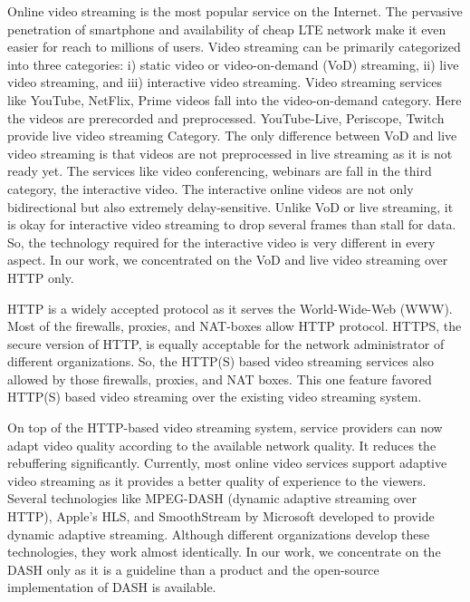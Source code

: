 Online video streaming is the most popular service on the Internet. The pervasive penetration of smartphone and availability of cheap LTE network make it even easier for reach to millions of users.
Video streaming can be primarily categorized into three categories: i) static video or video-on-demand (VoD) streaming, ii) live video streaming, and iii) interactive video streaming. Video streaming services like YouTube, NetFlix, Prime videos fall into the video-on-demand category. Here the videos are prerecorded and preprocessed. YouTube-Live, Periscope, Twitch provide live video streaming Category. The only difference between VoD and live video streaming is that videos are not preprocessed in live streaming as it is not ready yet. The services like video conferencing, webinars are fall in the third category, the interactive video. The interactive online videos are not only bidirectional but also extremely delay-sensitive. Unlike VoD or live streaming, it is okay for interactive video streaming to drop several frames than stall for data. So, the technology required for the interactive video is very different in every aspect. In our work, we concentrated on the VoD and live video streaming over HTTP only.

HTTP is a widely accepted protocol as it serves the World-Wide-Web (WWW). Most of the firewalls, proxies, and NAT-boxes allow HTTP protocol. HTTPS, the secure version of HTTP, is equally acceptable for the network administrator of different organizations. So, the HTTP(S) based video streaming services also allowed by those firewalls, proxies, and NAT boxes. This one feature favored HTTP(S) based video streaming over the existing video streaming system.

On top of the HTTP-based video streaming system, service providers can now adapt video quality according to the available network quality. It reduces the rebuffering significantly. Currently, most online video services support adaptive video streaming as it provides a better quality of experience to the viewers. Several technologies like MPEG-DASH (dynamic adaptive streaming over HTTP), Apple's HLS, and SmoothStream by Microsoft developed to provide dynamic adaptive streaming. Although different organizations develop these technologies, they work almost identically. In our work, we concentrate on the DASH only as it is a guideline than a product and the open-source implementation of DASH is available.

